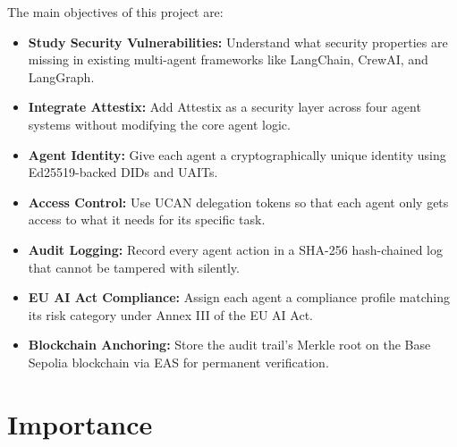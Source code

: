 The main objectives of this project are:

\begin{itemize}
    \item \textbf{Study Security Vulnerabilities:} Understand what security properties are missing in existing multi-agent frameworks like LangChain, CrewAI, and LangGraph.

    \item \textbf{Integrate Attestix:} Add Attestix as a security layer across four agent systems without modifying the core agent logic.

    \item \textbf{Agent Identity:} Give each agent a cryptographically unique identity using Ed25519-backed DIDs and UAITs.

    \item \textbf{Access Control:} Use UCAN delegation tokens so that each agent only gets access to what it needs for its specific task.

    \item \textbf{Audit Logging:} Record every agent action in a SHA-256 hash-chained log that cannot be tampered with silently.

    \item \textbf{EU AI Act Compliance:} Assign each agent a compliance profile matching its risk category under Annex III of the EU AI Act.

    \item \textbf{Blockchain Anchoring:} Store the audit trail's Merkle root on the Base Sepolia blockchain via EAS for permanent verification.
\end{itemize}

\section{Importance}

